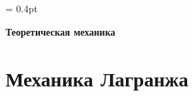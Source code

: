 \documentclass[12pt]{article}
\begin{document}
\renewcommand{\cftsecaftersnum}{.}
\renewcommand{\cftsubsecaftersnum}{.}

\renewcommand\refname{Список литературы}

\theoremstyle{plain}
\newtheorem{thm}{Теорема}[section]
\newtheorem{lem}[thm]{Лемма}

\theoremstyle{definition}
\newtheorem{dfn}{Определение}[section]
\newtheorem{cns}[thm]{Следствие}

\theoremstyle{remark}
\newtheorem{task}{Задача}[section]
\newtheorem{ex}{Пример}[subsection]
\newtheorem{cex}[ex]{Контрпример}
\newtheorem{rmk}{Замечание}[subsection]

\newcommand*{\eqdef}{\stackrel{\mathrm{def}}{=}}
\newcommand*{\is}[1]{\stackrel{\mathrm{\eqref{#1}}}{=}}
\newcommand*{\eqq}[1]{\stackrel{\mathrm{#1}}{=}}
\newcommand*{\hlf}{\frac{1}{2}}

\columnseprule = 0.4pt


\begin{center}
\Huge{\textbf{Теоретическая механика}}
\end{center}
\tableofcontents
\newpage

\section{Механика Лагранжа}

\newpage




\end{document}
